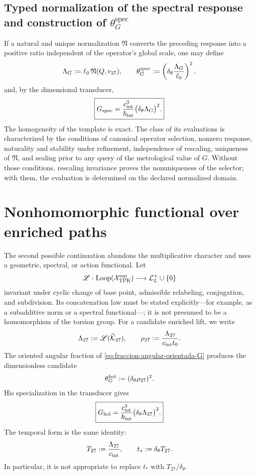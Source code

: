 \subsection{Typed normalization of the spectral response and construction of
\texorpdfstring{\(\theta_G^{\mathrm{spec}}\)}{theta G
spec}}

If a natural and unique normalization \(\mathfrak N\) converts the preceding
response into a positive ratio independent of the operator's global
scale, one may define
\[
 \Lambda_G
 :=\ell_0\,\mathfrak N(Q,v_{27}),
 \qquad
 \theta_G^{\rm spec}
 :=
 \left(
 \delta_\theta\frac{\Lambda_G}{\ell_0}
 \right)^2,
\]
and, by the dimensional transducer,
\[
 \boxed{
 G_{\rm spec}
 =
 \frac{c_{\rm int}^{3}}{\hbar_{\rm int}}
 \bigl(\delta_\theta\Lambda_G\bigr)^2.}
\]
The homogeneity of the template is exact. The class of its evaluations is
characterized by the conditions of canonical operator selection,
nonzero response, naturality and stability under refinement, independence
of rescaling, uniqueness of \(\mathfrak N\), and sealing prior to any query of
the metrological value of \(G\). Without those conditions, rescaling
invariance proves the nonuniqueness of the selector; with them, the evaluation is
determined on the declared normalized domain.

\section{Nonhomomorphic functional over enriched paths}
\label{sec:funcional-longitud-K27-G}

The second possible continuation abandons the multiplicative character and uses
a geometric, spectral, or action functional. Let
\[
 \mathscr L:
 \operatorname{Loop}(\mathcal X_{\rm TPK}^{\rm enr})
 \longrightarrow\mathcal L_L^+\cup\{0\}
\]
invariant under cyclic change of base point, admissible relabeling,
conjugation, and subdivision. Its concatenation law must be stated
explicitly---for example, as a subadditive norm or a spectral functional---;
it is not presumed to be a homomorphism of the torsion group. For a
candidate enriched lift, we write
\[
 \Lambda_{27}:=\mathscr L(\widetilde{\mathcal K}_{27}),
 \qquad
 \rho_{27}:=\frac{\Lambda_{27}}{c_{\rm int}t_0}.
\]
The oriented angular fraction of
\eqref{eq:fraccion-angular-orientada-G} produces the dimensionless candidate
\[
 \theta_G^{\rm hol}:=(\delta_\theta\rho_{27})^2.
\]
His specialization in the transducer gives
\[
 \boxed{
 G_{\rm hol}
 =\frac{c_{\rm int}^{3}}{\hbar_{\rm int}}
  \bigl(\delta_\theta\Lambda_{27}\bigr)^2.}
\]
The temporal form is the same identity:
\[
 T_{27}:=\frac{\Lambda_{27}}{c_{\rm int}},
 \qquad
 t_\ast:=\delta_\theta T_{27}.
\]
In particular, it is not appropriate to replace \(t_\ast\) with
\(T_{27}/\delta_\theta\).


